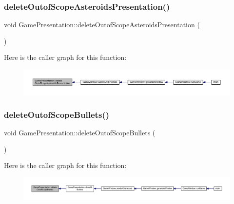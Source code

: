 \subsubsection{\texorpdfstring{delete\+Outof\+Scope\+Asteroids\+Presentation()}{deleteOutofScopeAsteroidsPresentation()}}
{\footnotesize\ttfamily void Game\+Presentation\+::delete\+Outof\+Scope\+Asteroids\+Presentation (\begin{DoxyParamCaption}{ }\end{DoxyParamCaption})}

Here is the caller graph for this function\+:\nopagebreak
\begin{figure}[H]
\begin{center}
\leavevmode
\includegraphics[width=350pt]{class_game_presentation_acd19622d7ee0ae8b898f5805ae94f2b4_icgraph}
\end{center}
\end{figure}
\mbox{\label{class_game_presentation_a313bd414a0cc712fccd919df4b794b8a}} 
\subsubsection{\texorpdfstring{delete\+Outof\+Scope\+Bullets()}{deleteOutofScopeBullets()}}
{\footnotesize\ttfamily void Game\+Presentation\+::delete\+Outof\+Scope\+Bullets (\begin{DoxyParamCaption}{ }\end{DoxyParamCaption})}

Here is the caller graph for this function\+:\nopagebreak
\begin{figure}[H]
\begin{center}
\leavevmode
\includegraphics[width=350pt]{class_game_presentation_a313bd414a0cc712fccd919df4b794b8a_icgraph}
\end{center}
\end{figure}
\mbox{\label{class_game_presentation_a874688a19d648902d43751a198e2d9ab}} 
